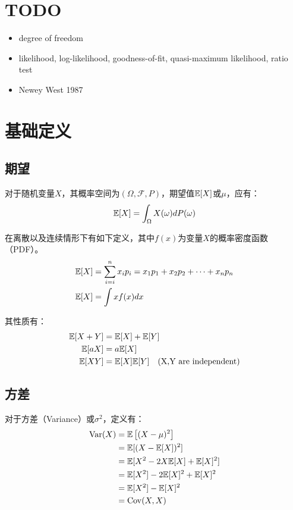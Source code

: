 \documentclass[11pt]{article}
\begin{document}
\maketitle
\tableofcontents

\section{TODO}
\begin{itemize}
    \item degree of freedom
    \item likelihood, log-likelihood, goodness-of-fit, quasi-maximum likelihood, ratio test
    \item Newey West 1987
\end{itemize}

\section{基础定义}

\subsection{期望}

对于随机变量$X$，其概率空间为$(\Omega,\mathcal{F},P)$，期望值$\mathbb{E}[X]$或$\mu$，应有：
\begin{equation*}
    \mathbb{E}[X] = \int_{\Omega} X(\omega) dP(\omega)
\end{equation*}

在离散以及连续情形下有如下定义，其中$f(x)$为变量$X$的概率密度函数（PDF）。
\begin{align*}
    \mathbb{E}[X] &= \sum_{i=i}^n x_i p_i =x_1 p_1 + x_2 p_2 + \dots + x_n p_n \\
    \mathbb{E}[X] &= \int x f(x) dx
\end{align*}

其性质有：
\begin{align*}
    \mathbb{E}[X+Y] &= \mathbb{E}[X] + \mathbb{E}[Y] \\
    \mathbb{E}[aX] &= a \mathbb{E}[X] \\
    \mathbb{E}[XY] &= \mathbb{E}[X]\mathbb{E}[Y] \quad \text{(X,Y are independent)}
\end{align*}

\subsection{方差}

对于方差（Variance）或$\sigma^2$，定义有：
\begin{align*}
    \operatorname{Var}(X) &= \mathbb{E}\left[ (X-\mu)^2 \right]\\
    &= \mathbb{E}[(X-\mathbb{E}[X])^2] \\
    &= \mathbb{E}[X^2 - 2X\mathbb{E}[X] + \mathbb{E}[X]^2] \\
    &= \mathbb{E}[X^2] - 2\mathbb{E}[X]^2 + \mathbb{E}[X]^2 \\
    &= \mathbb{E}[X^2] - \mathbb{E}[X]^2 \\
    &= \operatorname{Cov}(X,X)
\end{align*}
\end{document}
